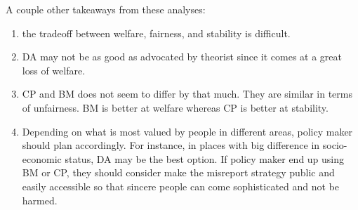 \documentclass[10pt, reqno]{amsart}
\begin{document}
A couple other takeaways from these analyses:
\begin{enumerate}
	\item the tradeoff between welfare, fairness, and stability is difficult.
	\item DA may not be as good as advocated by theorist since it comes at a great loss of welfare. 
	\item CP and BM does not seem to differ by that much. They are similar in terms of unfairness. BM is better at welfare whereas CP is better at stability.
	\item Depending on what is most valued by people in different areas, policy maker should plan accordingly. For instance, in places with big difference in socio-economic status, DA may be the best option. If policy maker end up using BM or CP, they should consider make the misreport strategy public and easily accessible so that sincere people can come sophisticated and not be harmed.
\end{enumerate}





\newpage


\end{document}
